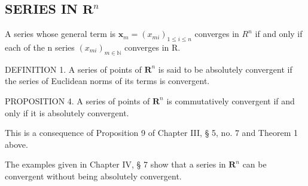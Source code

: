 \subsection{\texorpdfstring{SERIES IN \(\mathbf{R}^n\)}{SERIES IN R TO THE N}}

A series whose general term is \(\boldsymbol{x}_{m} = (x_{mi})_{1 \leqslant i \leqslant n}\) converges in \(R^{n}\) if and only if each of the n series \((x_{mi})_{m \in \mathbb{N}}\) converges in R.

DEFINITION 1. A series of points of \(\mathbf{R}^n\) is said to be absolutely convergent if the series of Euclidean norms of its terms is convergent.

PROPOSITION 4. A series of points of \(\mathbf{R}^n\) is commutatively convergent if and only if it is absolutely convergent.

This is a consequence of Proposition 9 of Chapter III, § 5, no. 7 and Theorem 1 above.

The examples given in Chapter IV, § 7 show that a series in \(\mathbf{R}^n\) can be convergent without being absolutely convergent.
\relax{}
\ExerciseGroupsStart
